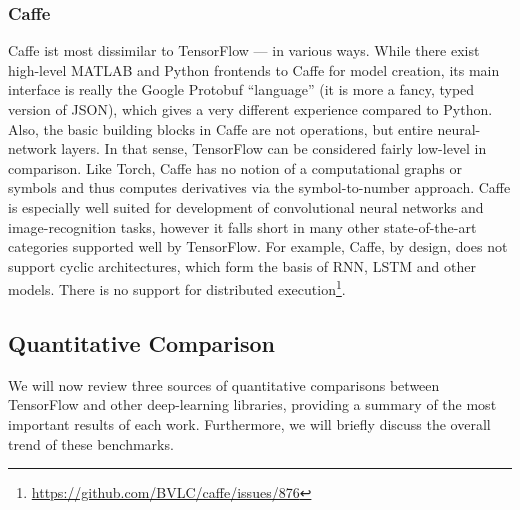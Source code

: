 \subsubsection{Caffe}\label{sec:comp-quality-caffe}

Caffe ist most dissimilar to TensorFlow --- in various ways. While there exist
high-level MATLAB and Python frontends to Caffe for model creation, its main
interface is really the Google Protobuf ``language'' (it is more a fancy, typed
version of JSON), which gives a very different experience compared to
Python. Also, the basic building blocks in Caffe are not operations, but entire
neural-network layers. In that sense, TensorFlow can be considered fairly
low-level in comparison. Like Torch, Caffe has no notion of a computational
graphs or symbols and thus computes derivatives via the symbol-to-number
approach. Caffe is especially well suited for development of convolutional
neural networks and image-recognition tasks, however it falls short in many
other state-of-the-art categories supported well by TensorFlow. For example,
Caffe, by design, does not support cyclic architectures, which form the basis of
RNN, LSTM and other models. There is no support for distributed
execution\footnote{\url{https://github.com/BVLC/caffe/issues/876}}.

\subsection{Quantitative Comparison}\label{sec:comp-quantity}

We will now review three sources of quantitative comparisons between TensorFlow
and other deep-learning libraries, providing a summary of the most important
results of each work. Furthermore, we will briefly discuss the overall trend of
these benchmarks.

